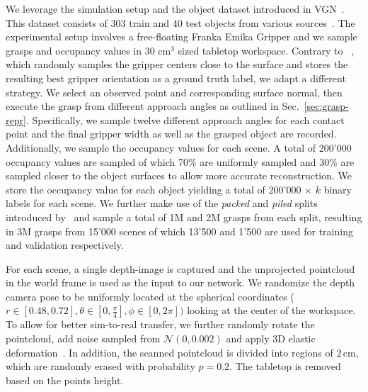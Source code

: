 \documentclass[letterpaper, 10 pt, conference]{ieeeconf}  %
\begin{document}
\label{dataset}
We leverage the simulation setup and the object dataset introduced in VGN~\cite{Breyer2021VolumetricGN}. This dataset consists of 303 train and 40 test objects from various sources~\cite{calli2017yale,kit_ds,Singh2014BigBIRDAL}. The experimental setup involves a free-floating Franka Emika Gripper and we sample grasps and occupancy values in $30$ cm$^3$ sized tabletop workspace. %
Contrary to ~\cite{Breyer2021VolumetricGN, Jiang2021SynergiesBA}, which randomly samples the gripper centers close to the surface and stores the resulting best gripper orientation as a ground truth label, we adapt a different strategy. We select an observed point and corresponding surface normal, then execute the grasp from different approach angles as outlined in Sec.~\ref{sec:grasp-repr}. Specifically, we sample twelve different approach angles for each contact point and the final gripper width as well as the grasped object are recorded. 
Additionally, we sample the occupancy values for each scene. A total of 200'000 occupancy values are sampled of which 70\% are uniformly sampled and 30\% are sampled closer to the object surfaces to allow more accurate reconstruction. We store the occupancy value for each object yielding a total of 200'000 $\times$ $k$ binary labels for each scene.
%
We further make use of the \emph{packed} and \emph{piled} splits introduced by~\cite{Breyer2021VolumetricGN} and sample a total of 1M and 2M grasps from each split, resulting in 3M grasps from 15'000 scenes of which 13'500 and 1'500 are used for training and validation respectively. 


For each scene, a single depth-image is captured and the unprojected pointcloud in the world frame is used as the input to our network.
We randomize the depth camera pose to be uniformly located at the spherical coordinates ($r\in [0.48, 0.72], \theta \in [0, \frac{\pi}{4}], \phi \in [0, 2 \pi])$ looking at the center of the workspace.
To allow for better sim-to-real transfer, we further randomly rotate the pointcloud, add noise sampled from $\mathcal{N}(0, 0.002)$ and apply 3D elastic deformation~\cite{vantulder2021}.
In addition, the scanned pointcloud is divided into regions of $2$\,cm, which are randomly erased with probability $p=0.2$. The tabletop is removed based on the points height.
\end{document}
